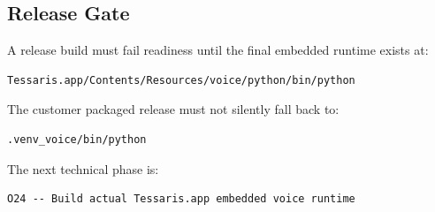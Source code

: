 \subsection{Release Gate}

A release build must fail readiness until the final embedded runtime exists at:

\begin{verbatim}
Tessaris.app/Contents/Resources/voice/python/bin/python
\end{verbatim}

The customer packaged release must not silently fall back to:

\begin{verbatim}
.venv_voice/bin/python
\end{verbatim}

The next technical phase is:

\begin{verbatim}
O24 -- Build actual Tessaris.app embedded voice runtime
\end{verbatim}
